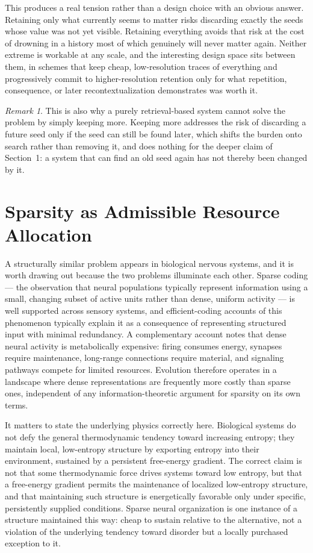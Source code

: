 \documentclass[11pt]{amsart}
\theoremstyle{plain}
\theoremstyle{definition}
\theoremstyle{remark}
\newtheorem{remark}[theorem]{Remark}
\begin{document}
This produces a real tension rather than a design choice with an
obvious answer. Retaining only what currently seems to matter risks
discarding exactly the seeds whose value was not yet visible. Retaining
everything avoids that risk at the cost of drowning in a history most
of which genuinely will never matter again. Neither extreme is
workable at any scale, and the interesting design space sits between
them, in schemes that keep cheap, low-resolution traces of everything
and progressively commit to higher-resolution retention only for what
repetition, consequence, or later recontextualization demonstrates was
worth it.

\begin{remark}
This is also why a purely retrieval-based system cannot solve the
problem by simply keeping more. Keeping more addresses the risk of
discarding a future seed only if the seed can still be found later,
which shifts the burden onto search rather than removing it, and does
nothing for the deeper claim of Section~1: a system that can find an
old seed again has not thereby been changed by it.
\end{remark}

\section{Sparsity as Admissible Resource Allocation}

A structurally similar problem appears in biological nervous systems,
and it is worth drawing out because the two problems illuminate each
other. Sparse coding --- the observation that neural populations
typically represent information using a small, changing subset of
active units rather than dense, uniform activity --- is well supported
across sensory systems, and efficient-coding accounts of this
phenomenon typically explain it as a consequence of representing
structured input with minimal redundancy. A complementary account
notes that dense neural activity is metabolically expensive: firing
consumes energy, synapses require maintenance, long-range connections
require material, and signaling pathways compete for limited resources.
Evolution therefore operates in a landscape where dense representations
are frequently more costly than sparse ones, independent of any
information-theoretic argument for sparsity on its own terms.

It matters to state the underlying physics correctly here. Biological
systems do not defy the general thermodynamic tendency toward increasing
entropy; they maintain local, low-entropy structure by exporting
entropy into their environment, sustained by a persistent free-energy
gradient. The correct claim is not that some thermodynamic force drives
systems toward low entropy, but that a free-energy gradient permits the
maintenance of localized low-entropy structure, and that maintaining
such structure is energetically favorable only under specific,
persistently supplied conditions. Sparse neural organization is one
instance of a structure maintained this way: cheap to sustain relative
to the alternative, not a violation of the underlying tendency toward
disorder but a locally purchased exception to it.
\end{document}
